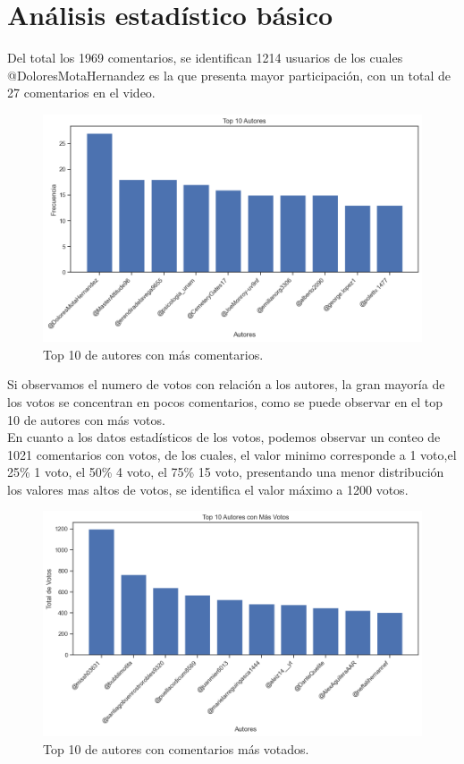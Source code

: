  \section{Análisis estadístico básico}
 
 Del total los 1969 comentarios, se identifican 1214 usuarios de los cuales @DoloresMotaHernandez es la que presenta mayor participación, con un total de 27 comentarios en el video.\\
 
\begin{figure}[!h]
	\centering
	\includegraphics[width=15cm]{../Datos/top10autores}
	\caption{Top 10 de autores con más comentarios.}
	\label{fig:top10A}
\end{figure}

Si observamos el numero de votos con relación a los autores, la gran mayoría de los votos se concentran en pocos comentarios, como se puede observar en el top 10 de autores con más votos.\\

En cuanto a los datos estadísticos de los votos, podemos observar un conteo de 1021 comentarios con votos, de los cuales, el valor minimo corresponde a 1 voto,el 25\% 1 voto, el 50\% 4 voto, el 75\% 15 voto, presentando una menor distribución los valores mas altos de votos, se identifica el valor máximo a 1200 votos.\\

\begin{figure}[!h]
	\centering
	\includegraphics[width=15cm]{../Datos/top10autoresMasVotos}
	\caption{Top 10 de autores con comentarios más votados.}
	\label{fig:top10AMV}
\end{figure}

